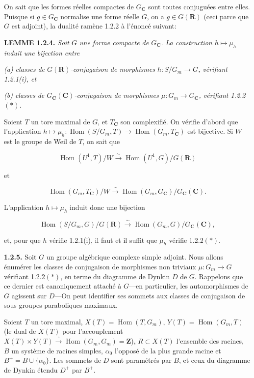 \documentclass[10pt,a4paper]{article}
\newcommand{\SourcePage}[2]{\clearpage\setcounter{page}{#2}\typeout{D031_SOURCE_PAGE physical=#1 printed=#2}}
\begin{document}
On sait que les formes réelles compactes de \(G_{\mathbf C}\) sont toutes conjuguées entre elles. Puisque si \(g\in G_{\mathbf C}\) normalise une forme réelle \(G\), on a \(g\in G(\mathbf R)\) (ceci parce que \(G\) est adjoint), la dualité ramène 1.2.2 à l'énoncé suivant:

\SourcePage{12}{258}
\textbf{LEMME 1.2.4.} \emph{Soit \(G\) une forme compacte de \(G_{\mathbf C}\). La construction \(h\mapsto\mu_h\) induit une bijection entre}

\emph{(a) classes de \(G(\mathbf R)\)-conjugaison de morphismes \(h:S/G_m\to G\), vérifiant 1.2.1(i), et}

\emph{(b) classes de \(G_{\mathbf C}(\mathbf C)\)-conjugaison de morphismes \(\mu:G_m\to G_{\mathbf C}\), vérifiant 1.2.2\((*)\).}

Soient \(T\) un tore maximal de \(G\), et \(T_{\mathbf C}\) son complexifié. On vérifie d'abord que l'application \(h\mapsto\mu_h:\operatorname{Hom}(S/G_m,T)\to\operatorname{Hom}(G_m,T_{\mathbf C})\) est bijective. Si \(W\) est le groupe de Weil de \(T\), on sait que

\[
\operatorname{Hom}(U^1,T)/W\xrightarrow{\sim}\operatorname{Hom}(U^1,G)/G(\mathbf R)
\]

et

\[
\operatorname{Hom}(G_m,T_{\mathbf C})/W\xrightarrow{\sim}\operatorname{Hom}(G_m,G_{\mathbf C})/G_{\mathbf C}(\mathbf C).
\]

L'application \(h\mapsto\mu_h\) induit donc une bijection

\[
\operatorname{Hom}(S/G_m,G)/G(\mathbf R)\xrightarrow{\sim}\operatorname{Hom}(G_m,G)/G_{\mathbf C}(\mathbf C),
\]

et, pour que \(h\) vérifie 1.2.1(i), il faut et il suffit que \(\mu_h\) vérifie 1.2.2\((*)\).

\textbf{1.2.5.} Soit \(G\) un groupe algébrique complexe simple adjoint. Nous allons énumérer les classes de conjugaison de morphismes non triviaux \(\mu:G_m\to G\) vérifiant 1.2.2\((*)\), en terme du diagramme de Dynkin \(D\) de \(G\). Rappelons que ce dernier est canoniquement attaché à \(G\)---en particulier, les automorphismes de \(G\) agissent sur \(D\)---On peut identifier ses sommets aux classes de conjugaison de sous-groupes paraboliques maximaux.

Soient \(T\) un tore maximal, \(X(T)=\operatorname{Hom}(T,G_m)\), \(Y(T)=\operatorname{Hom}(G_m,T)\) (le dual de \(X(T)\) pour l'accouplement \(X(T)\times Y(T)\xrightarrow{\circ}\operatorname{Hom}(G_m,G_m)=\mathbf Z\)), \(R\subset X(T)\) l'ensemble des racines, \(B\) un système de racines simples, \(\alpha_0\) l'opposé de la plus grande racine et \(B^+=B\cup\{\alpha_0\}\). Les sommets de \(D\) sont paramétrés par \(B\), et ceux du diagramme de Dynkin étendu \(D^+\) par \(B^+\).
\end{document}
